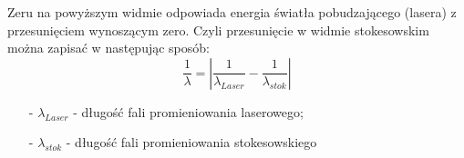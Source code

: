 Zeru na powyższym widmie odpowiada energia światła pobudzającego (lasera) z przesunięciem wynoszącym zero. Czyli przesunięcie w widmie stokesowskim można zapisać w następując sposób:
\begin{equation}
	\frac{1}{\lambda} = \left| \frac{1}{\lambda_{Laser}} - \frac{1}{\lambda_{stok}} \right|
\end{equation}
\begin{itemize}
	\item[-]{$\lambda_{Laser}$ - długość fali promieniowania laserowego};
	\item[-]{$\lambda_{stok}$ - długość fali promieniowania stokesowskiego}
\end{itemize}













